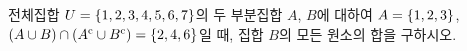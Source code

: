 전체집합 $U=\{1{,}\mkern3mu\mathopen{}2{,}\mkern3mu\mathopen{}3{,}\mkern3mu\mathopen{}4{,}\mkern3mu\mathopen{}5{,}\mkern3mu\mathopen{}6{,}\mkern3mu\mathopen{}7\}$의 두 부분집합 $A$, $B$에 대하여 $A=\{1{,}\mkern3mu\mathopen{}2{,}\mkern3mu\mathopen{}3\}$, $(A\cup B)\cap({A}^{\mathrm{c}}\cup{B}^{\mathrm{c}})=\{2{,}\mkern3mu\mathopen{}4{,}\mkern3mu\mathopen{}6\}$일 때, 집합 $B$의 모든 원소의 합을 구하시오.
